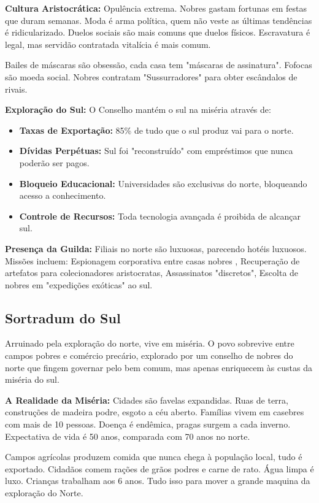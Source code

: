 \textbf{\ringmfamily Cultura Aristocrática:}
Opulência extrema. Nobres gastam fortunas em festas que duram semanas. Moda é arma política, quem não veste as últimas tendências é ridicularizado. Duelos sociais são mais comuns que duelos físicos. Escravatura é legal, mas servidão contratada vitalícia é mais comum.

Bailes de máscaras são obsessão, cada casa tem "máscaras de assinatura". Fofocas são moeda social. Nobres contratam "Sussurradores" para obter escândalos de rivais.

\textbf{\ringmfamily Exploração do Sul:}
O Conselho mantém o sul na miséria através de:
\begin{itemize}
    \item \textbf{Taxas de Exportação:} 85\% de tudo que o sul produz vai para o norte.
    \item \textbf{Dívidas Perpétuas:} Sul foi "reconstruído" com empréstimos que nunca poderão ser pagos.
    \item \textbf{Bloqueio Educacional:} Universidades são exclusivas do norte, bloqueando acesso a conhecimento.
    \item \textbf{Controle de Recursos:} Toda tecnologia avançada é proibida de alcançar sul.
\end{itemize}

\textbf{\ringmfamily Presença da Guilda:} Filiais no norte são luxuosas, parecendo hotéis luxuosos. Missões incluem: Espionagem corporativa entre casas nobres
, Recuperação de artefatos para colecionadores aristocratas, Assassinatos "discretos", Escolta de nobres em "expedições exóticas" ao sul.

\subsection*{Sortradum do Sul}
Arruinado pela exploração do norte, vive em miséria. O povo sobrevive entre campos pobres e comércio precário, explorado por um conselho de nobres do norte que fingem governar pelo bem comum, mas apenas enriquecem às custas da miséria do sul.

\textbf{\ringmfamily A Realidade da Miséria:}
Cidades são favelas expandidas. Ruas de terra, construções de madeira podre, esgoto a céu aberto. Famílias vivem em casebres com mais de 10 pessoas. Doença é endêmica, pragas surgem a cada inverno. Expectativa de vida é 50 anos, comparada com 70 anos no norte.

Campos agrícolas produzem comida que nunca chega à população local, tudo é exportado. Cidadãos comem rações de grãos podres e carne de rato. Água limpa é luxo. Crianças trabalham aos 6 anos. Tudo isso para mover a grande maquina da exploração do Norte.

